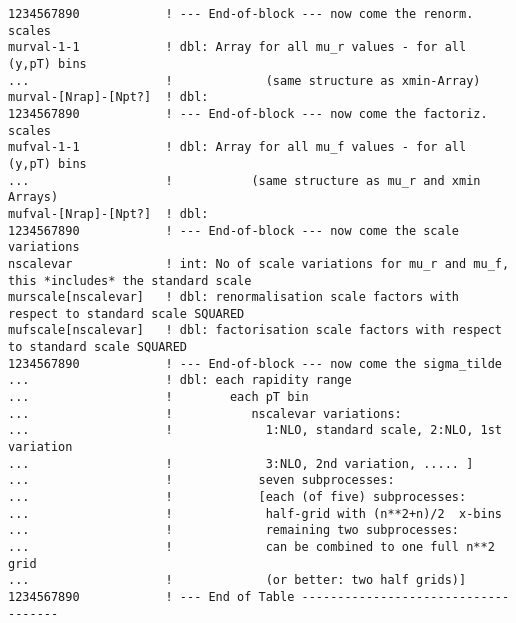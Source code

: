 {\begin{verbatim}
1234567890            ! --- End-of-block --- now come the renorm. scales
murval-1-1            ! dbl: Array for all mu_r values - for all (y,pT) bins
...                   !             (same structure as xmin-Array)
murval-[Nrap]-[Npt?]  ! dbl:
1234567890            ! --- End-of-block --- now come the factoriz. scales
mufval-1-1            ! dbl: Array for all mu_f values - for all (y,pT) bins
...                   !           (same structure as mu_r and xmin Arrays)
mufval-[Nrap]-[Npt?]  ! dbl:
1234567890            ! --- End-of-block --- now come the scale variations
nscalevar             ! int: No of scale variations for mu_r and mu_f, this *includes* the standard scale
murscale[nscalevar]   ! dbl: renormalisation scale factors with respect to standard scale SQUARED
mufscale[nscalevar]   ! dbl: factorisation scale factors with respect to standard scale SQUARED
1234567890            ! --- End-of-block --- now come the sigma_tilde
...                   ! dbl: each rapidity range
...                   !        each pT bin
...                   !           nscalevar variations:
...                   !             1:NLO, standard scale, 2:NLO, 1st variation
...                   !             3:NLO, 2nd variation, ..... ]
...                   !            seven subprocesses:     
...                   !            [each (of five) subprocesses:
...                   !             half-grid with (n**2+n)/2  x-bins
...                   !             remaining two subprocesses: 
...                   !             can be combined to one full n**2 grid
...                   !             (or better: two half grids)]
1234567890            ! --- End of Table ------------------------------------
\end{verbatim}
}

